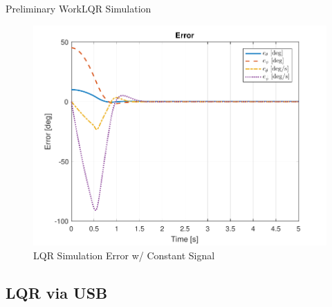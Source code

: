 \documentclass{beamer}
\begin{document}
\begin{frame}{Preliminary Work}{LQR Simulation}
    \begin{figure}
      \centering 
      \includegraphics[scale=0.5]{figs/matlab/LQR/P_Simulation/LQR_Error_Con}
      \caption{LQR Simulation Error w/ Constant Signal}
      \label{fig:LQR_Error_Con}
    \end{figure}
\end{frame}



\subsection{LQR via USB} %


\end{document}
